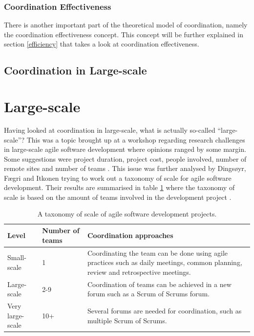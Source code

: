 \subsubsection{Coordination Effectiveness}

There is another important part of the theoretical model of coordination, namely the coordination effectiveness concept. This concept will be further explained in section \ref{efficiency} that takes a look at coordination effectiveness.


\subsection{Coordination in Large-scale}



\section{Large-scale}

Having looked at coordination in large-scale, what is actually so-called ``large-scale''? This was a topic brought up at a workshop regarding research challenges in large-scale agile software development where opinions ranged by some margin. Some suggestions were project duration, project cost, people involved, number of remote sites and number of teams \cite{Dingsoyr2013b}. This issue was further analysed by Dingsøyr, Fægri and Itkonen trying to work out a taxonomy of scale for agile software development. Their results are summarised in table \ref{Scale} where the taxonomy of scale is based on the amount of teams involved in the development project \cite{Dingsoyr2013a}.

\begin{table}[H]
\begin{center}
    \begin{tabular}{| l | l | p{7cm} |}
    \hline
    \textbf{Level} & \textbf{Number of teams} & \textbf{Coordination approaches} \\ \hline
    Small-scale & 1 & Coordinating the team can be done using agile practices such as daily meetings, common planning, review and retrospective meetings. \\ \hline
    Large-scale & 2-9 & Coordination of teams can be achieved in a new forum such as a Scrum of Scrums forum. \\ \hline
    Very large-scale & 10+ & Several forums are needed for coordination, such as multiple Scrum of Scrums. \\
    \hline
    \end{tabular}
    \caption{A taxonomy of scale of agile software development projects.}
    \label{Scale}
\end{center}
\end{table}

